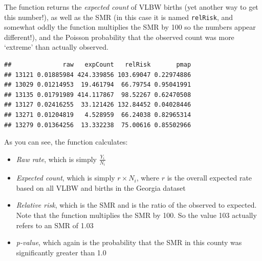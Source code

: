 \documentclass[
]{book}
\newenvironment{Shaded}{\begin{snugshade}}{\end{snugshade}}
\newcommand{\AttributeTok}[1]{\textcolor[rgb]{0.77,0.63,0.00}{#1}}
\newcommand{\CommentTok}[1]{\textcolor[rgb]{0.56,0.35,0.01}{\textit{#1}}}
\newcommand{\FunctionTok}[1]{\textcolor[rgb]{0.00,0.00,0.00}{#1}}
\newcommand{\NormalTok}[1]{#1}
\newcommand{\OtherTok}[1]{\textcolor[rgb]{0.56,0.35,0.01}{#1}}
\newcommand{\SpecialCharTok}[1]{\textcolor[rgb]{0.00,0.00,0.00}{#1}}
\newcommand{\StringTok}[1]{\textcolor[rgb]{0.31,0.60,0.02}{#1}}
\providecommand{\tightlist}{%
  \setlength{\itemsep}{0pt}\setlength{\parskip}{0pt}}
\begin{document}
The function returns the \emph{expected count} of VLBW births (yet another way to get this number!), as well as the SMR (in this case it is named \texttt{relRisk}, and somewhat oddly the function multiplies the SMR by 100 so the numbers appear different!), and the Poisson probability that the observed count was more `extreme' than actually observed.

\begin{Shaded}
\end{Shaded}

\begin{verbatim}
##              raw   expCount   relRisk       pmap
## 13121 0.01885984 424.339856 103.69047 0.22974886
## 13029 0.01214953  19.461794  66.79754 0.95041991
## 13135 0.01791989 414.117867  98.52267 0.62470508
## 13127 0.02416255  33.121426 132.84452 0.04028446
## 13271 0.01204819   4.528959  66.24038 0.82965314
## 13279 0.01364256  13.332238  75.00616 0.85502966
\end{verbatim}

As you can see, the function calculates:

\begin{itemize}
\tightlist
\item
  \emph{Raw rate}, which is simply \(\frac{Y_i}{N_i}\)
\item
  \emph{Expected count}, which is simply \(r\times N_i\), where \(r\) is the overall expected rate based on all VLBW and births in the Georgia dataset
\item
  \emph{Relative risk}, which is the SMR and is the ratio of the observed to expected. Note that the function multiplies the SMR by 100. So the value 103 actually refers to an SMR of 1.03
\item
  \emph{p-value}, which again is the probability that the SMR in this county was significantly greater than 1.0
\end{itemize}
\end{document}
